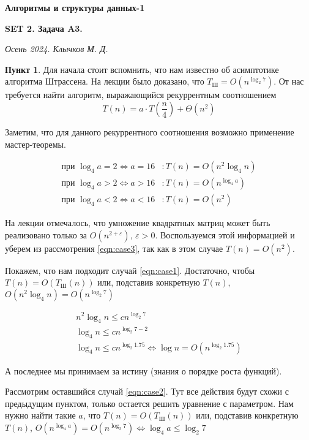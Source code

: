 \documentclass[11pt,a4paper]{scrarticle}
\author{Клычков Максим Дмитриевич}
\theoremstyle{definition}
\newtheorem{subtask}{Пункт}
\begin{document}
\centerline{\textbf{\huge Алгоритмы и структуры данных-1}}
\centerline{\textbf{SET 2. Задача A3.}}
\begin{flushright}
	\emph{Осень 2024. Клычков М. Д.}
\end{flushright}

\begin{subtask}
	Для начала стоит вспомнить, что нам известно об асимптотике алгоритма Штрассена. На лекции было доказано, что $T_\text{Ш} = O(n^{\log_2 7})$. От нас требуется найти алгоритм, выражающийся рекуррентным соотношением
	\begin{equation}
		\label{eqn:t}
		T(n) = a \cdot T\left(\frac{n}{4}\right) + \Theta(n^2)
	\end{equation}

	Заметим, что для данного рекуррентного соотношения возможно применение мастер-теоремы.

	\begin{align}
		\label{eqn:case1} \text{при } \log_4 a = 2 \Leftrightarrow a = 16 & \colon T(n) = O(n^2 \log_4 n) \\
		\label{eqn:case2} \text{при } \log_4 a > 2 \Leftrightarrow a > 16 & \colon T(n) = O(n^{\log_4 a}) \\
		\label{eqn:case3} \text{при } \log_4 a < 2 \Leftrightarrow a < 16 & \colon T(n) = O(n^2)
	\end{align}


	На лекции отмечалось, что умножение квадратных матриц может быть реализовано только за $O(n^{2+\varepsilon}), \, \varepsilon > 0$. Воспользуемся этой информацией и уберем из рассмотрения \eqref{eqn:case3}, так как в этом случае $T(n) = O(n^2)$.

	Покажем, что нам подходит случай \eqref{eqn:case1}. Достаточно, чтобы $T(n) = O(T_\text{Ш}(n))$ или, подставив конкретную $T(n)$, $O(n^2 \log_4 n) = O(n^{\log_2 7})$

	\begin{gather*}
		n^2 \log_4 n \leq c n^{\log_2 7} \\
		\log_4 n \leq c n^{\log_2 7 - 2} \\
		\log_4 n \leq c n^{\log_2 1.75} \Leftrightarrow \log n = O(n^{\log_2 1.75})
	\end{gather*}

	А последнее мы принимаем за истину (знания о порядке роста функций).

	Рассмотрим оставшийся случай \eqref{eqn:case2}. Тут все действия будут схожи с предыдущим пунктом, только остается решить уравнение с параметром.
	Нам нужно найти такие $a$, что $T(n) = O(T_\text{Ш}(n))$ или, подставив конкретную $T(n)$, $O(n^{\log_4 a}) = O(n^{\log_2 7}) \Leftrightarrow \log_4 a \leq \log_2 7$


\end{subtask}
\end{document}
